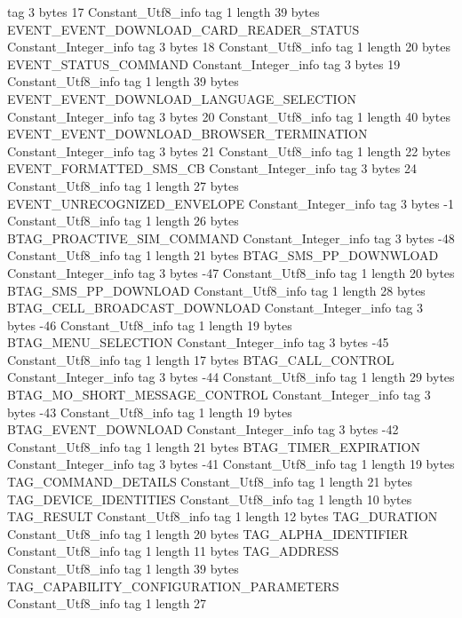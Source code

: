 {{{			tag	3
			bytes	17
		}
		Constant_Utf8_info {
			tag	1
			length	39
			bytes	EVENT_EVENT_DOWNLOAD_CARD_READER_STATUS
		}
		Constant_Integer_info {
			tag	3
			bytes	18
		}
		Constant_Utf8_info {
			tag	1
			length	20
			bytes	EVENT_STATUS_COMMAND
		}
		Constant_Integer_info {
			tag	3
			bytes	19
		}
		Constant_Utf8_info {
			tag	1
			length	39
			bytes	EVENT_EVENT_DOWNLOAD_LANGUAGE_SELECTION
		}
		Constant_Integer_info {
			tag	3
			bytes	20
		}
		Constant_Utf8_info {
			tag	1
			length	40
			bytes	EVENT_EVENT_DOWNLOAD_BROWSER_TERMINATION
		}
		Constant_Integer_info {
			tag	3
			bytes	21
		}
		Constant_Utf8_info {
			tag	1
			length	22
			bytes	EVENT_FORMATTED_SMS_CB
		}
		Constant_Integer_info {
			tag	3
			bytes	24
		}
		Constant_Utf8_info {
			tag	1
			length	27
			bytes	EVENT_UNRECOGNIZED_ENVELOPE
		}
		Constant_Integer_info {
			tag	3
			bytes	-1
		}
		Constant_Utf8_info {
			tag	1
			length	26
			bytes	BTAG_PROACTIVE_SIM_COMMAND
		}
		Constant_Integer_info {
			tag	3
			bytes	-48
		}
		Constant_Utf8_info {
			tag	1
			length	21
			bytes	BTAG_SMS_PP_DOWNWLOAD
		}
		Constant_Integer_info {
			tag	3
			bytes	-47
		}
		Constant_Utf8_info {
			tag	1
			length	20
			bytes	BTAG_SMS_PP_DOWNLOAD
		}
		Constant_Utf8_info {
			tag	1
			length	28
			bytes	BTAG_CELL_BROADCAST_DOWNLOAD
		}
		Constant_Integer_info {
			tag	3
			bytes	-46
		}
		Constant_Utf8_info {
			tag	1
			length	19
			bytes	BTAG_MENU_SELECTION
		}
		Constant_Integer_info {
			tag	3
			bytes	-45
		}
		Constant_Utf8_info {
			tag	1
			length	17
			bytes	BTAG_CALL_CONTROL
		}
		Constant_Integer_info {
			tag	3
			bytes	-44
		}
		Constant_Utf8_info {
			tag	1
			length	29
			bytes	BTAG_MO_SHORT_MESSAGE_CONTROL
		}
		Constant_Integer_info {
			tag	3
			bytes	-43
		}
		Constant_Utf8_info {
			tag	1
			length	19
			bytes	BTAG_EVENT_DOWNLOAD
		}
		Constant_Integer_info {
			tag	3
			bytes	-42
		}
		Constant_Utf8_info {
			tag	1
			length	21
			bytes	BTAG_TIMER_EXPIRATION
		}
		Constant_Integer_info {
			tag	3
			bytes	-41
		}
		Constant_Utf8_info {
			tag	1
			length	19
			bytes	TAG_COMMAND_DETAILS
		}
		Constant_Utf8_info {
			tag	1
			length	21
			bytes	TAG_DEVICE_IDENTITIES
		}
		Constant_Utf8_info {
			tag	1
			length	10
			bytes	TAG_RESULT
		}
		Constant_Utf8_info {
			tag	1
			length	12
			bytes	TAG_DURATION
		}
		Constant_Utf8_info {
			tag	1
			length	20
			bytes	TAG_ALPHA_IDENTIFIER
		}
		Constant_Utf8_info {
			tag	1
			length	11
			bytes	TAG_ADDRESS
		}
		Constant_Utf8_info {
			tag	1
			length	39
			bytes	TAG_CAPABILITY_CONFIGURATION_PARAMETERS
		}
		Constant_Utf8_info {
			tag	1
			length	27
}}}
